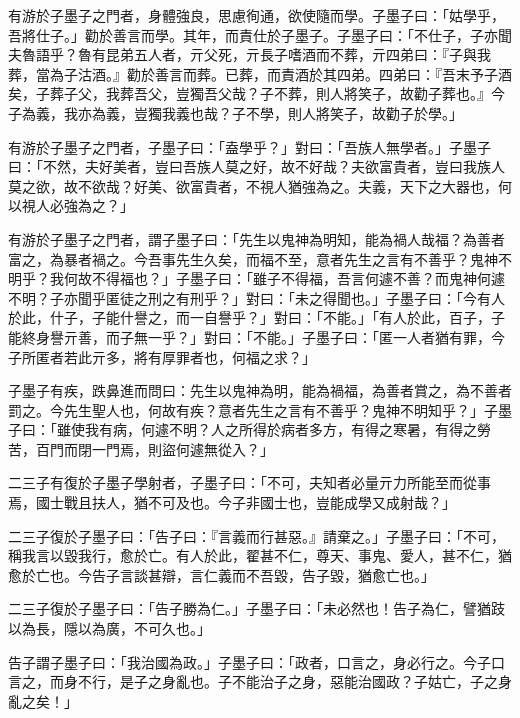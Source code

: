 \begin{pinyinscope}
有游於子墨子之門者，身體強良，思慮徇通，欲使隨而學。子墨子曰：「姑學乎，吾將仕子。」勸於善言而學。其年，而責仕於子墨子。子墨子曰：「不仕子，子亦聞夫魯語乎？魯有昆弟五人者，亓父死，亓長子嗜酒而不葬，亓四弟曰：『子與我葬，當為子沽酒。』勸於善言而葬。已葬，而責酒於其四弟。四弟曰：『吾末予子酒矣，子葬子父，我葬吾父，豈獨吾父哉？子不葬，則人將笑子，故勸子葬也。』今子為義，我亦為義，豈獨我義也哉？子不學，則人將笑子，故勸子於學。」

有游於子墨子之門者，子墨子曰：「盍學乎？」對曰：「吾族人無學者。」子墨子曰：「不然，夫好美者，豈曰吾族人莫之好，故不好哉？夫欲富貴者，豈曰我族人莫之欲，故不欲哉？好美、欲富貴者，不視人猶強為之。夫義，天下之大器也，何以視人必強為之？」

有游於子墨子之門者，謂子墨子曰：「先生以鬼神為明知，能為禍人哉福？為善者富之，為暴者禍之。今吾事先生久矣，而福不至，意者先生之言有不善乎？鬼神不明乎？我何故不得福也？」子墨子曰：「雖子不得福，吾言何遽不善？而鬼神何遽不明？子亦聞乎匿徒之刑之有刑乎？」對曰：「未之得聞也。」子墨子曰：「今有人於此，什子，子能什譽之，而一自譽乎？」對曰：「不能。」「有人於此，百子，子能終身譽亓善，而子無一乎？」對曰：「不能。」子墨子曰：「匿一人者猶有罪，今子所匿者若此亓多，將有厚罪者也，何福之求？」

子墨子有疾，跌鼻進而問曰：先生以鬼神為明，能為禍福，為善者賞之，為不善者罰之。今先生聖人也，何故有疾？意者先生之言有不善乎？鬼神不明知乎？」子墨子曰：「雖使我有病，何遽不明？人之所得於病者多方，有得之寒暑，有得之勞苦，百門而閉一門焉，則盜何遽無從入？」

二三子有復於子墨子學射者，子墨子曰：「不可，夫知者必量亓力所能至而從事焉，國士戰且扶人，猶不可及也。今子非國士也，豈能成學又成射哉？」

二三子復於子墨子曰：「告子曰：『言義而行甚惡。』請棄之。」子墨子曰：「不可，稱我言以毀我行，愈於亡。有人於此，翟甚不仁，尊天、事鬼、愛人，甚不仁，猶愈於亡也。今告子言談甚辯，言仁義而不吾毀，告子毀，猶愈亡也。」

二三子復於子墨子曰：「告子勝為仁。」子墨子曰：「未必然也！告子為仁，譬猶跂以為長，隱以為廣，不可久也。」

告子謂子墨子曰：「我治國為政。」子墨子曰：「政者，口言之，身必行之。今子口言之，而身不行，是子之身亂也。子不能治子之身，惡能治國政？子姑亡，子之身亂之矣！」


\end{pinyinscope}